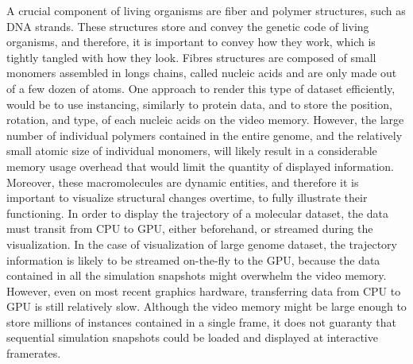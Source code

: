 % 

A crucial component of living organisms are fiber and polymer structures, such as DNA strands.
These structures store and convey the genetic code of living organisms, and therefore, it is important to convey how they work, which is tightly tangled with how they look.
Fibres structures are composed of small monomers assembled in longs chains, called nucleic acids and are only made out of a few dozen of atoms.
One approach to render this type of dataset efficiently, would be to use instancing, similarly to protein data, and to store the position, rotation, and type, of each nucleic acids on the video memory.
However, the large number of individual polymers contained in the entire genome, and the relatively small atomic size of individual monomers, will likely result in a considerable memory usage overhead that would limit the quantity of displayed information.
%
Moreover, these macromolecules are dynamic entities, and therefore it is important to visualize structural changes overtime, to fully illustrate their functioning.
In order to display the trajectory of a molecular dataset, the data must transit from CPU to GPU, either beforehand, or streamed during the visualization.
In the case of visualization of large genome dataset, the trajectory information is likely to be streamed on-the-fly to the GPU, because the data contained in all the simulation snapshots might overwhelm the video memory.
However, even on most recent graphics hardware, transferring data from CPU to GPU is still relatively slow.
Although the video memory might be large enough to store millions of instances contained in a single frame, it does not guaranty that sequential simulation snapshots could be loaded and displayed at interactive framerates.

